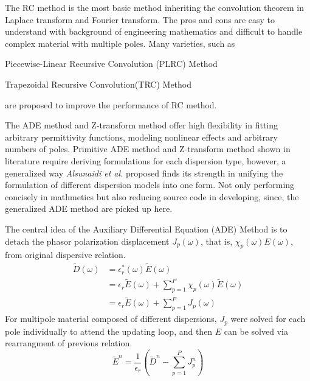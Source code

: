The RC method is the most basic method inheriting the convolution theorem in Laplace transform and Fourier
transform. The pros and cons are easy to understand with background of engineering mathematics and difficult to handle
complex material with multiple poles. Many varieties, such as
\begin{inparaenum}[(1)]
\item Piecewise-Linear Recursive Convolution (PLRC) Method
\item Trapezoidal Recursive Convolution(TRC) Method
\end{inparaenum} are proposed to improve the performance of RC method.


The ADE method and Z-transform method offer high flexibility in fitting arbitrary permittivity functions, modeling
nonlinear effects and arbitrary numbers of poles. Primitive ADE method and Z-transform method shown in literature
require deriving formulations for each dispersion type, however, a generalized way \textit{Alsunaidi et al.} proposed
finds its strength in unifying the formulation of different dispersion models into one form. Not only performing
concisely in mathmetics but also reducing source code in developing, since, the generalized ADE method are picked up
here.

The central idea of the Auxiliary Differential Equation (ADE) Method is to detach the phasor polarization displacement
$J_p(\omega)$, that is, $\chi_p(\omega)E(\omega)$, from original dispersive relation.
\begin{equation}
  \begin{split}
    \widetilde{D}(\omega) &= \epsilon_r^*(\omega)\widetilde{E}(\omega)\\
    & = \epsilon_r\widetilde{E}(\omega) + \sum_{p=1}^P\chi_p(\omega)\widetilde{E}(\omega)\\
    & = \epsilon_r\widetilde{E}(\omega) + \sum_{p=1}^{P}J_p(\omega)
  \end{split}
\end{equation}
For multipole material composed of different dispersions, $J_p$ were solved for each pole individually to attend the
updating loop, and then $E$ can be solved via rearrangment of previous relation.
\begin{equation}\label{eq:dispersive}
  \widetilde{E}^n = \frac{1}{\epsilon_r}\left(\widetilde{D}^n - \sum_{p=1}^PJ_p^n\right)
\end{equation}

